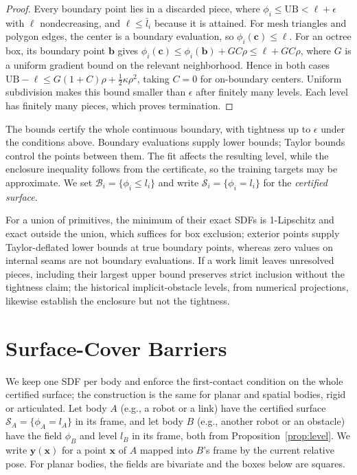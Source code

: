 \documentclass[journal]{IEEEtran}
\theoremstyle{definition}
\begin{document}
\begin{proof}
Every boundary point lies in a discarded piece, where $\phi_i\le\mathrm{UB}<\ell+\epsilon$ with $\ell$
nondecreasing, and $\ell\le\bar l_i$ because it is attained. For mesh triangles and polygon
edges, the center is a boundary evaluation, so $\phi_i(\mathbf c)\le\ell$.
For an octree box, its boundary point $\mathbf b$ gives
$\phi_i(\mathbf c)\le\phi_i(\mathbf b)+GC\rho\le\ell+GC\rho$, where $G$ is a uniform gradient bound
on the relevant neighborhood. Hence in both cases
$\mathrm{UB}-\ell\le G(1+C)\rho+\tfrac12\kappa\rho^2$, taking $C=0$ for on-boundary centers.
Uniform subdivision makes this bound smaller than $\epsilon$ after finitely many levels.
Each level has finitely many pieces, which proves termination.
\end{proof}
The bounds certify the whole continuous boundary, with tightness up to $\epsilon$ under the
conditions above. Boundary evaluations supply lower bounds; Taylor bounds control the points
between them. The fit affects the resulting level, while the enclosure inequality follows from
the certificate, so the training targets may be approximate. We set $\mathcal B_i=\{\phi_i\le l_i\}$ and write
$\mathcal S_i=\{\phi_i=l_i\}$ for the \emph{certified surface}.

For a union of primitives, the minimum of their exact SDFs is 1-Lipschitz and exact outside the
union, which suffices for box exclusion; exterior points supply Taylor-deflated lower bounds at true
boundary points, whereas zero values on internal seams are not boundary evaluations. If a work limit
leaves unresolved pieces, including their largest upper bound preserves strict inclusion without the
tightness claim; the historical implicit-obstacle levels, from numerical projections, likewise
establish the enclosure but not the tightness.

\section{Surface-Cover Barriers}\label{sec:cover}
We keep one SDF per body and enforce the first-contact condition on the whole certified surface; the
construction is the same for planar and spatial bodies, rigid or articulated. Let body $A$ (e.g., a
robot or a link) have the certified surface $\mathcal S_A=\{\phi_A=l_A\}$ in its frame, and let body $B$
(e.g., another robot or an obstacle) have the field $\phi_B$ and level $l_B$ in its frame, both from
Proposition~\ref{prop:level}. We write $\mathbf y(\mathbf x)$ for a point $\mathbf x$ of $A$ mapped into
$B$'s frame by the current relative pose. For planar bodies, the fields are bivariate and the boxes
below are squares.
\end{document}
